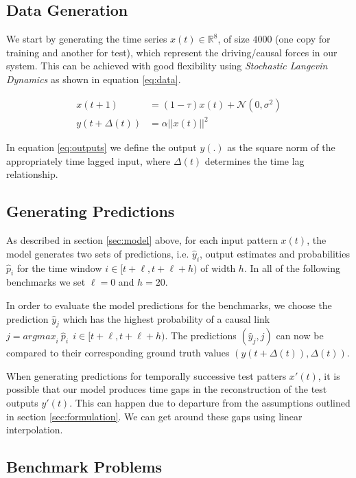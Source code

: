 \documentclass[envcountsect,runningheads]{llncs}
\theoremstyle{etoile}
\begin{document}
\subsection{Data Generation}

We start by generating the time series $x(t) \in \mathbb{R}^8$, of size $4000$ 
(one copy for training and another for test), which represent the driving/causal forces in our system. 
This can be achieved with good flexibility using \emph{Stochastic Langevin Dynamics} as shown in 
equation \ref{eq:data}.

\begin{align}
 x(t+1) &= (1 - \tau) x(t) + \mathcal{N}(0, \sigma^2) \label{eq:data}\\
 y(t+\Delta(t)) &= \alpha ||x(t)||^2 \label{eq:outputs}
\end{align}

In equation \ref{eq:outputs} we define the output $y(.)$ as the square norm of the appropriately 
time lagged input, where $\Delta(t)$ determines the time lag relationship.

\subsection{Generating Predictions}

As described in section \ref{sec:model} above, for each input pattern $x(t)$, the model 
generates two sets of predictions, i.e. ${\hat{y}_i}$, output estimates and probabilities $\hat{p}_i$ 
for the time window $i \in [t+\ell, t+\ell+h)$ of width $h$. In all of the following benchmarks we set 
$\ell = 0$ and $h = 20$.

In order to evaluate the model predictions for the benchmarks, we choose the prediction $\hat{y}_j$ 
which has the highest probability of a causal link $j = {argmax}_{i} \ \hat{p}_i \ \ i \in [t+\ell, t+\ell+h)$. 
The predictions $(\hat{y}_j, j)$ can now be compared to their corresponding ground truth values 
$(y(t + \Delta(t)), \Delta(t))$. 

When generating predictions for temporally successive test patters $x'(t)$, it is possible that our 
model produces time gaps in the reconstruction of the test outputs $y'(t)$. This can happen due to 
departure from the assumptions outlined in section \ref{sec:formulation}. We can get around these 
gaps using linear interpolation.


\subsection{Benchmark Problems}\label{sec:benchmark}
\end{document}
